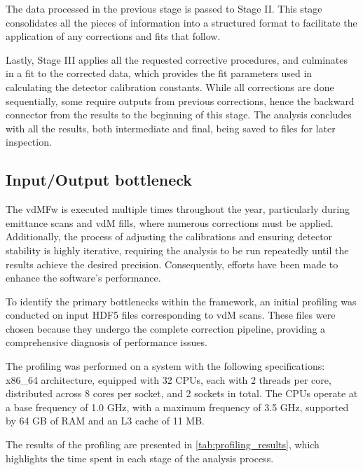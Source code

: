 The data processed in the previous stage is passed to Stage II. This stage consolidates all the pieces of information into a structured format to facilitate the application of any corrections and fits that follow.

Lastly, Stage III applies all the requested corrective procedures, and culminates in a fit to the corrected data, which provides the fit parameters used in calculating the detector calibration constants. While all corrections are done sequentially, some require outputs from previous corrections, hence the backward connector from the results to the beginning of this stage. The analysis concludes with all the results, both intermediate and final, being saved to files for later inspection.

\subsection{Input/Output bottleneck}
\label{subsec:io_bottleneck}

The vdMFw is executed multiple times throughout the year, particularly during emittance scans and vdM fills, where numerous corrections must be applied. Additionally, the process of adjusting the calibrations and ensuring detector stability is highly iterative, requiring the analysis to be run repeatedly until the results achieve the desired precision. Consequently, efforts have been made to enhance the software's performance.

To identify the primary bottlenecks within the framework, an initial profiling was conducted on input HDF5 files corresponding to vdM scans. These files were chosen because they undergo the complete correction pipeline, providing a comprehensive diagnosis of performance issues.

The profiling was performed on a system with the following specifications: x86\_64 architecture, equipped with 32 CPUs, each with 2 threads per core, distributed across 8 cores per socket, and 2 sockets in total. The CPUs operate at a base frequency of 1.0 GHz, with a maximum frequency of 3.5 GHz, supported by 64 GB of RAM and an L3 cache of 11 MB.

The results of the profiling are presented in \autoref{tab:profiling_results}, which highlights the time spent in each stage of the analysis process.

